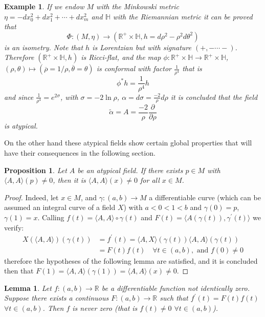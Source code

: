\documentclass{amsart}%
\theoremstyle{plain}
\newtheorem{example}{Example}
\newtheorem{lemma}{Lemma}
\newtheorem{proposition}{Proposition}
\numberwithin{equation}{section}
\begin{document}
\begin{example}
If we endow $M$ with the Minkowski metric $\eta=-dx_{0}^{2}+dx_{1}^{2}%
+\cdots+dx_{m}^{2}$ and $\mathbb{H}$ with the Riemannian metric it can be
proved that%
\[
\Phi:\left(  M,\eta\right)  \rightarrow\left(  \mathbb{R}^{+}\times
\mathbb{H},h=d\rho^{2}-\rho^{2}d\theta^{2}\right)
\]
is an isometry. Note that $h$ is Lorentzian but with signature $\left(
+,-\cdots-\right)  $. Therefore $\left(  \mathbb{R}^{+}\times\mathbb{H}%
,h\right)  $ is Ricci-flat, and the map $\phi:\mathbb{R}^{+}\times
\mathbb{H\rightarrow R}^{+}\times\mathbb{H}$, $\left(  \rho,\theta\right)
\mapsto\left(  \overline{\rho}=1/\rho,\overline{\theta}=\theta\right)  $ is
conformal with factor $\frac{1}{\rho^{4}}$ that is%
\[
\phi^{\ast}h=\frac{1}{\rho^{4}}h
\]
and since $\frac{1}{\rho^{4}}=e^{2\sigma}$, with $\sigma=-2\ln\rho$,
$\alpha=d\sigma=\frac{-2}{\rho}d\rho$ it is concluded that the field%
\[
\widetilde{\alpha}=A=\frac{-2}{\rho}\frac{\partial}{\partial\rho}%
\]
is atypical.
\end{example}

On the other hand these atypical fields show certain global properties that
will have their consequences in the following section.

\begin{proposition}
\label{1.2}Let $A$ be an atypical field. If there exists $p\in M$ with
$\langle A,A\rangle(p)\neq0$, then it is $\langle A,A\rangle(x)\neq0$ for all
$x\in M$.
\end{proposition}

\begin{proof}
Indeed, let $x\in M$, and $\gamma:(a,b)\longrightarrow M$ a differentiable
curve (which can be assumed an integral curve of a field $X$) with $a<0<1<b$
and $\gamma(0)=p$, $\gamma(1)=x$. Calling $f(t)=\langle A,A\rangle\circ
\gamma(t)$ and $F(t)=\langle A(\gamma(t)),\gamma^{\prime}(t)\rangle$ we
verify:
\begin{align*}
X(\langle A,A\rangle)(\gamma(t))  &  =f^{\prime}(t)=\langle A,X\rangle
(\gamma(t))\langle A,A\rangle(\gamma(t))\\
&  =F(t)f(t)\quad\forall t\in(a,b),\text{ and }f(0)\neq0
\end{align*}
therefore the hypotheses of the following lemma are satisfied, and it is
concluded then that $F(1)=\langle A,A\rangle(\gamma(1))=\langle A,A\rangle
(x)\neq0$.
\end{proof}

\begin{lemma}
Let $f:(a,b)\rightarrow\mathbb{R}$ be a differentiable function not
identically zero. Suppose there exists a continuous $F:(a,b)\rightarrow
\mathbb{R}$ such that $f^{\prime}(t)=F(t)f(t)$ $\forall t\in(a,b)$. Then $f$
is never zero (that is $f(t)\neq0$ $\forall t\in(a,b)$).
\end{lemma}
\end{document}
